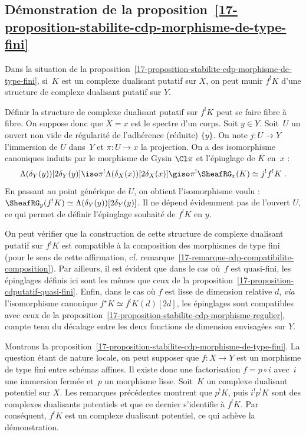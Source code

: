 \documentclass[10pt]{../fichiers-configuration-latex/smfart}
\begin{document}
\subsection{Démonstration de la proposition~\ref{17-proposition-stabilite-cdp-morphisme-de-type-fini}}%
\label{17-subsection-morphismes-de-type-fini}

\begin{lemme2}\label{17-lemme-construction-cdputatif-f-bang}
Dans la situation de la
proposition~\ref{17-proposition-stabilite-cdp-morphisme-de-type-fini},
si $K$ est un complexe dualisant putatif sur $X$,
on peut munir $f^!K$ d'une structure de
complexe dualisant putatif sur $Y$.
\end{lemme2}

Définir la structure de complexe dualisant putatif sur $f^!K$ peut se faire
fibre à fibre. On suppose donc que $X=x$ est le spectre d'un corps.
Soit $y\in Y$. Soit $U$ un ouvert non vide de régularité de l'adhérence
(réduite) $\overline{\{y\}}$. On note $j\colon U\to Y$ l'immersion de $U$
dans $Y$ et $\pi\colon U\to x$ la projection. On a des isomorphisme
canoniques induits par le morphisme de Gysin $\Cl \pi$ et l'épinglage de
$K$ en $x$ :
\[\Lambda(\delta_Y(y))[2\delta_Y(y)]\iso
\pi^!\Lambda(\delta_X(x))[2\delta_X(x)]\giso \pi^!\SheafRG_x(K)
\simeq j^!f^!K\;\text{.}\]
En passant au point générique de $U$, on obtient l'isomorphisme voulu :
$\SheafRG_y(f^!K)\simeq \Lambda(\delta_Y(y))[2\delta_Y(y)]$. Il ne
dépend évidemment pas de l'ouvert $U$, ce qui permet de définir l'épinglage
souhaité de $f^!K$ en $y$.

\medskip

On peut vérifier que la construction de cette structure de complexe
dualisant putatif sur $f^!K$ est compatible à la composition des morphismes
de type fini (pour le sens de cette affirmation, cf.
remarque~\ref{17-remarque-cdp-compatibilite-composition}). Par ailleurs, il
est évident que dans le cas où $f$ est quasi-fini, les épinglages définis
ici sont les mêmes que ceux de la
proposition~\ref{17-proposition-cdputatif-quasi-fini}. Enfin, dans le cas où
$f$ est lisse de dimension relative $d$,
\emph{via} l'isomorphisme canonique $f^\star K\simeq
f^!K(d)[2d]$, les épinglages sont compatibles avec ceux de la
proposition~\ref{17-proposition-stabilite-cdp-morphisme-regulier}, compte tenu
du décalage entre les deux fonctions de dimension envisagées sur $Y$.

\bigskip

Montrons la
proposition~\ref{17-proposition-stabilite-cdp-morphisme-de-type-fini}. La
question étant de nature locale, on peut supposer que $f\colon X\to Y$ est
un morphisme de type fini entre schémas affines. Il existe donc une
factorisation $f=p\circ i$ avec $i$ une immersion fermée et $p$ un
morphisme lisse. Soit $K$ un complexe dualisant potentiel sur $X$.
Les remarques précédentes montrent que $p^!K$,
puis $i^!p^!K$ sont des complexes dualisants
potentiels et que ce dernier s'identifie à $f^!K$.
Par conséquent, $f^!K$ est un
complexe dualisant potentiel, ce qui achève la démonstration.
\end{document}

